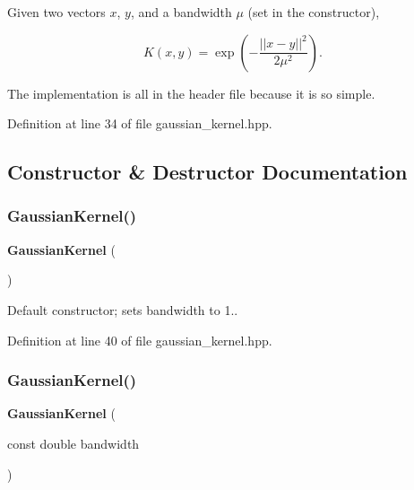 Given two vectors $ x $, $ y $, and a bandwidth $ \mu $ (set in the constructor),

\[ K(x, y) = \exp(-\frac{|| x - y ||^2}{2 \mu^2}). \]

The implementation is all in the header file because it is so simple. 

Definition at line 34 of file gaussian\+\_\+kernel.\+hpp.



\subsection{Constructor \& Destructor Documentation}
\mbox{\label{classmlpack_1_1kernel_1_1GaussianKernel_a3e3737b271f9d6a43319dd5aedc8390e}} 
\subsubsection{Gaussian\+Kernel()\hspace{0.1cm}{\footnotesize\ttfamily [1/2]}}
{\footnotesize\ttfamily \textbf{ Gaussian\+Kernel} (\begin{DoxyParamCaption}{ }\end{DoxyParamCaption})\hspace{0.3cm}{\ttfamily [inline]}}



Default constructor; sets bandwidth to 1.. 



Definition at line 40 of file gaussian\+\_\+kernel.\+hpp.

\mbox{\label{classmlpack_1_1kernel_1_1GaussianKernel_a863246483e645a55547661d9d470667e}} 
\subsubsection{Gaussian\+Kernel()\hspace{0.1cm}{\footnotesize\ttfamily [2/2]}}
{\footnotesize\ttfamily \textbf{ Gaussian\+Kernel} (\begin{DoxyParamCaption}\item[{const double}]{bandwidth }\end{DoxyParamCaption})\hspace{0.3cm}{\ttfamily [inline]}}



